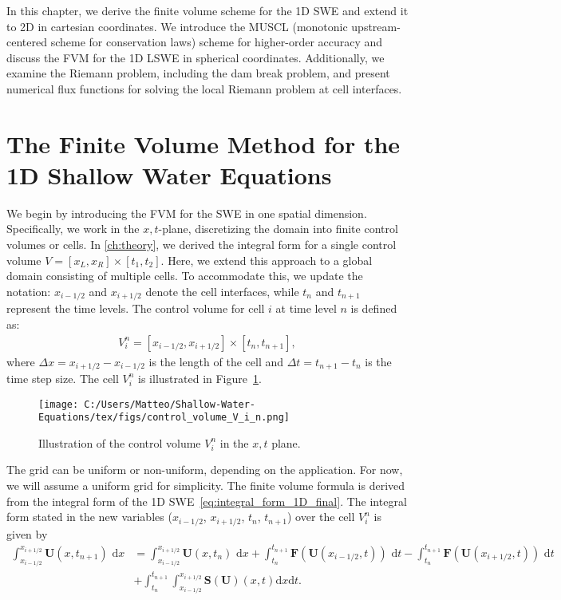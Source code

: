 In this chapter, we derive the finite volume scheme for the 1D SWE and extend it to 2D in cartesian coordinates.
We introduce the MUSCL (monotonic upstream-centered scheme for conservation laws) scheme for higher-order accuracy and discuss the FVM for the 1D LSWE in spherical coordinates.
Additionally, we examine the Riemann problem, including the dam break problem, and present numerical flux functions for solving the local Riemann problem at cell interfaces.

\section{The Finite Volume Method for the 1D Shallow Water Equations}\label{sec:FVM_1D_SWE}
We begin by introducing the FVM for the SWE in one spatial dimension.
Specifically, we work in the \(x,t\)-plane, discretizing the domain into finite control volumes or cells.
In \autoref{ch:theory}, we derived the integral form for a single control volume \(V = [x_L, x_R] \times [t_1, t_2]\).
Here, we extend this approach to a global domain consisting of multiple cells.
To accommodate this, we update the notation: \(x_{i-1/2}\) and \(x_{i+1/2}\) denote the cell interfaces, while \(t_n\) and \(t_{n+1}\) represent the time levels.
The control volume for cell $i$ at time level $n$ is defined as:
\begin{align*}
    V_i^n = [x_{i-1/2}, x_{i+1/2}] \times [t_n, t_{n+1}],
\end{align*}
where $\Delta x = x_{i+1/2} - x_{i-1/2}$ is the length of the cell and $\Delta t = t_{n+1} - t_n$ is the time step size.
The cell $V_i^n$ is illustrated in Figure~\ref{fig:control_volume_V_i_n}.
\begin{figure}[H]
    \centering
    \texttt{[image: C:/Users/Matteo/Shallow-Water-Equations/tex/figs/control\_volume\_V\_i\_n.png]}
    \caption{Illustration of the control volume $V_i^n$ in the $x,t$ plane.}\label{fig:control_volume_V_i_n}
\end{figure}
The grid can be uniform or non-uniform, depending on the application.
For now, we will assume a uniform grid for simplicity.
The finite volume formula is derived from the integral form of the 1D SWE~\eqref{eq:integral_form_1D_final}.
The integral form stated in the new variables ($x_{i-1/2}$, $x_{i+1/2}$, $t_n$, $t_{n+1}$) over the cell $V_i^n$ is given by
\begin{equation}\label{eq:integral_form_1D_SWE_new_variables}
    \begin{aligned}
    \int_{x_{i-1/2}}^{x_{i+1/2}} \mathbf{U}(x,t_{n+1}) \text{ d}x &= 
    \int_{x_{i-1/2}}^{x_{i+1/2}} \mathbf{U}(x,t_n) \text{ d}x + 
    \int_{t_n}^{t_{n+1}} \mathbf{F}(\mathbf{U}(x_{i-1/2}, t)) \text{ d}t -
    \int_{t_n}^{t_{n+1}} \mathbf{F}(\mathbf{U}(x_{i+1/2}, t)) \text{ d}t \\
    &+
    \int_{t_n}^{t_{n+1}} \int_{x_{i-1/2}}^{x_{i+1/2}} \mathbf{S(U)}(x,t) \text{d}x \text{d}t.
    \end{aligned}
\end{equation}
